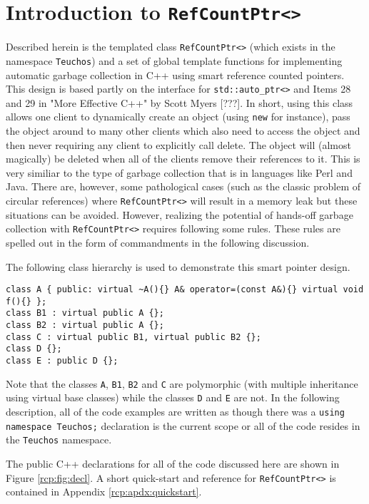 %
\section{Introduction to \texttt{RefCountPtr<>}}
%

Described herein is the templated class \texttt{RefCountPtr<>} (which
exists in the namespace \texttt{Teuchos}) and a set of global template
functions for implementing automatic garbage collection in C++ using
smart reference counted pointers.  This design is based partly on the
interface for \texttt{std::auto\_ptr<>} and Items 28 and 29 in "More
Effective C++" by Scott Myers [???]. In short, using this class allows
one client to dynamically create an object (using \texttt{new} for
instance), pass the object around to many other clients which also
need to access the object and then never requiring any client to
explicitly call delete.  The object will (almost magically) be deleted
when all of the clients remove their references to it.  This is very
similiar to the type of garbage collection that is in languages like
Perl and Java.  There are, however, some pathological cases (such as
the classic problem of circular references) where
\texttt{RefCountPtr<>} will result in a memory leak but these
situations can be avoided.  However, realizing the potential of
hands-off garbage collection with \texttt{RefCountPtr<>} requires
following some rules.  These rules are spelled out in the form of
commandments in the following discussion.

The following class hierarchy is used to demonstrate this smart
pointer design.
%
{\scriptsize\begin{verbatim}
class A { public: virtual ~A(){} A& operator=(const A&){} virtual void f(){} };
class B1 : virtual public A {};
class B2 : virtual public A {};
class C : virtual public B1, virtual public B2 {};
class D {};
class E : public D {};
\end{verbatim}}
%
Note that the classes \texttt{A}, \texttt{B1}, \texttt{B2} and
\texttt{C} are polymorphic (with multiple inheritance using virtual
base classes) while the classes \texttt{D} and \texttt{E} are not.  In
the following description, all of the code examples are written as
though there was a \texttt{using namespace Teuchos;} declaration is
the current scope or all of the code resides in the
\texttt{Teuchos} namespace.

The public C++ declarations for all of the code discussed here are
shown in Figure \ref{rcp:fig:decl}.  A short quick-start and reference
for \texttt{RefCountPtr<>} is contained in Appendix
\ref{rcp:apdx:quickstart}.

